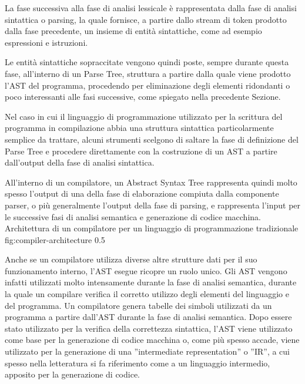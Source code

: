 La fase successiva alla fase di analisi lessicale è rappresentata dalla fase di
analisi sintattica o parsing, la quale fornisce, a partire dallo stream di
token prodotto dalla fase precedente, un insieme di entità sintattiche, come ad
esempio espressioni e istruzioni.

Le entità sintattiche sopraccitate vengono quindi poste, sempre durante questa
fase, all’interno di un Parse Tree, struttura a partire dalla quale viene
prodotto l’AST del programma, procedendo per eliminazione degli elementi
ridondanti o poco interessanti alle fasi successive, come spiegato nella
precedente Sezione.

Nel caso in cui il linguaggio di programmazione utilizzato per la scrittura del
programma in compilazione abbia una struttura sintattica particolarmente
semplice da trattare, alcuni strumenti scelgono di saltare la fase di
definizione del Parse Tree e procedere direttamente con la costruzione di un
AST a partire dall’output della fase di analisi sintattica.

All’interno di un compilatore, un Abstract Syntax Tree rappresenta quindi molto
spesso l’output di una della fase di elaborazione compiuta dalla componente
parser, o più generalmente l’output della fase di parsing, e rappresenta
l’input per le successive fasi di analisi semantica e generazione di codice
macchina. \\

      {Architettura di un compilatore per un linguaggio di programmazione
      tradizionale}
      {fig:compiler-architecture}
      {0.5}

Anche se un compilatore utilizza diverse altre strutture dati per il suo
funzionamento interno, l’AST esegue ricopre un ruolo unico. Gli AST vengono
infatti utilizzati molto intensamente durante la fase di analisi semantica,
durante la quale un compilare verifica il corretto utilizzo degli elementi del
linguaggio e del programma. Un compilatore genera tabelle dei simboli
utilizzati da un programma a partire dall’AST durante la fase di analisi
semantica. Dopo essere stato utilizzato per la verifica della correttezza
sintattica, l’AST viene utilizzato come base per la generazione di codice
macchina o, come più spesso accade, viene utilizzato per la generazione di una
”intermediate representation” o ”IR”, a cui spesso nella letteratura si fa
riferimento come a un linguaggio intermedio, apposito per la generazione di
codice. \\

